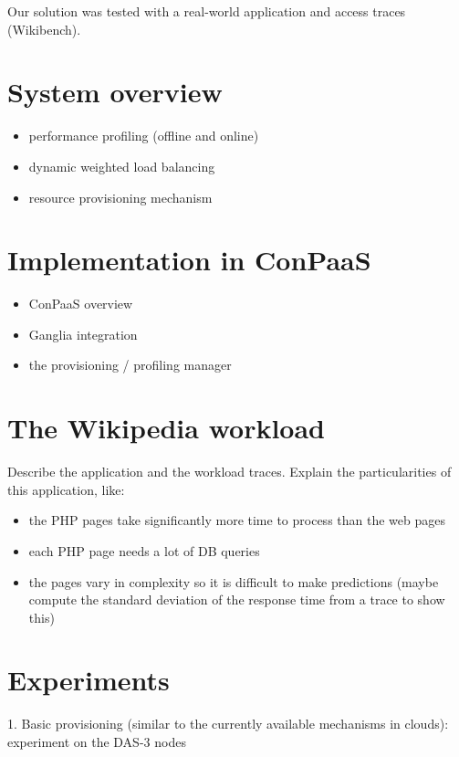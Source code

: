 \documentclass[10pt,twocolumn]{article}
\begin{document}
Our solution was tested with a real-world application and access traces (Wikibench).


\section*{System overview}

\begin{itemize}
\item performance profiling (offline and online)
\item dynamic weighted load balancing
\item resource provisioning mechanism
\end{itemize}


\section*{Implementation in ConPaaS}


\begin{itemize}
\item ConPaaS overview
\item Ganglia integration
\item the provisioning / profiling manager
\end{itemize}


\section*{The Wikipedia workload}

Describe the application and the workload traces. Explain
the particularities of this application, like:

\begin{itemize}
\item the PHP pages take significantly more time to process
than the web pages
\item each PHP page needs a lot of DB queries 
\item the pages vary in complexity so it is difficult to make
predictions (maybe compute the standard deviation of the response time
from a trace to show this)
\end{itemize}


\section*{Experiments}

1. Basic provisioning (similar to the currently available mechanisms in clouds):
experiment on the DAS-3 nodes
\end{document}
